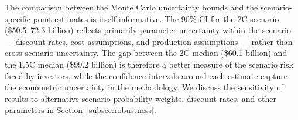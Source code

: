 The comparison between the Monte Carlo uncertainty bounds and the scenario-specific point estimates is itself informative. The 90\% CI for the 2\textdegree C scenario (\$50.5--72.3 billion) reflects primarily parameter uncertainty within the scenario --- discount rates, cost assumptions, and production assumptions --- rather than cross-scenario uncertainty. The gap between the 2\textdegree C median (\$60.1 billion) and the 1.5\textdegree C median (\$99.2 billion) is therefore a better measure of the scenario risk faced by investors, while the confidence intervals around each estimate capture the econometric uncertainty in the methodology. We discuss the sensitivity of results to alternative scenario probability weights, discount rates, and other parameters in Section~\ref{subsec:robustness}.



